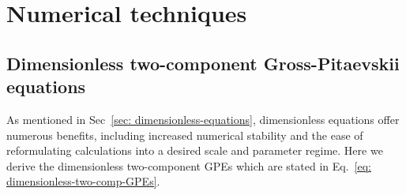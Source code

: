 \chapter{Numerical techniques}\label{appendix: numerical-techniques}

\section{\label{sec: two-comp-dimensionless}Dimensionless two-component
Gross-Pitaevskii equations}

As mentioned in Sec~\ref{sec: dimensionless-equations}, dimensionless equations
offer numerous benefits, including increased numerical stability and the ease
of reformulating calculations into a desired scale and parameter regime.
Here we derive the dimensionless two-component GPEs which are stated in
Eq.~\eqref{eq: dimensionless-two-comp-GPEs}.

